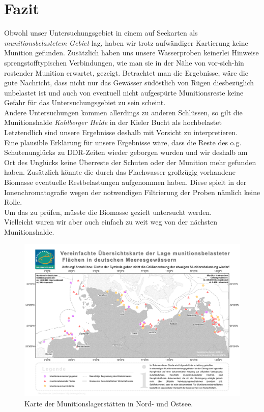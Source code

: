 
\chapter[Fazit]{Fazit}

Obwohl unser Untersuchungsgebiet in einem auf Seekarten als \emph{munitionsbelastetem Gebiet} lag, haben wir trotz aufwändiger Kartierung keine Munition gefunden. Zusätzlich haben uns unsere Wasserproben keinerlei Hinweise sprengstofftypischen Verbindungen, wie man sie in der Nähe von vor-sich-hin rostender Munition erwartet, gezeigt. Betrachtet man die Ergebnisse, wäre die gute Nachricht, dass nicht nur das Gewässer südöstlich von Rügen diesbezüglich unbelastet ist und auch von eventuell nicht aufgespürte Munitionsreste keine Gefahr für das Untersuchungsgebiet zu sein scheint. \\
Andere Untersuchungen kommen allerdings zu anderen Schlüssen, so gilt die Munitionshalde \emph{Kohlberger Heide} in der Kieler Bucht als hochbelastet\cite{kohl} \\
Letztendlich sind unsere Ergebnisse deshalb mit Vorsicht zu interpretieren. \\
Eine plausible Erklärung für unsere Ergebnisse wäre, dass die Reste des o.g. Schutenunglücks zu DDR-Zeiten wieder geborgen wurden und wir deshalb am Ort des Unglücks keine Überreste der Schuten oder der Munition mehr gefunden haben.
Zusätzlich könnte die durch das Flachwasser großzügig vorhandene Biomasse eventuelle Restbelastungen aufgenommen haben. Diese spielt in der Ionenchromatografie wegen der notwendigen Filtrierung der Proben nämlich keine Rolle. \\
Um das zu prüfen, müsste die Biomasse gezielt untersucht werden.\\
Vielleicht waren wir aber auch einfach zu weit weg von der nächsten Munitionshalde.\\
\begin{figure}[htb!]
\includegraphics[height=\textheight,%
                   width=\textwidth,%
                   keepaspectratio]{Bilder/karte_muni.PDF}
\caption{Karte der Munitionslagerstätten in Nord- und Ostsee\cite{shmuni}.}
\end{figure}

